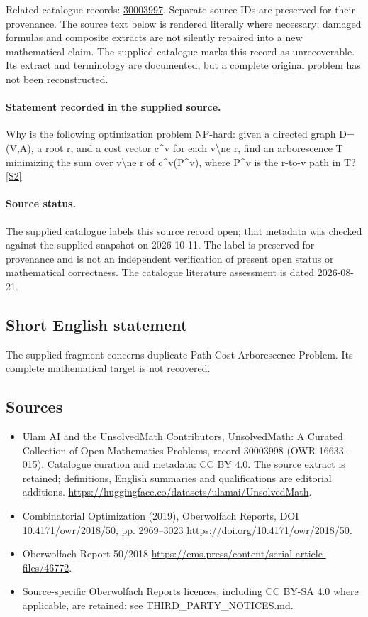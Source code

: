 \documentclass[11pt]{article}
\begin{document}
Related catalogue records: \href{https://mehmetmars7.github.io/Erdosproblems-llm-hunter/problem.html?type=open_problems&id=30003997}{30003997}. Separate source IDs are preserved for their provenance.
The source text below is rendered literally where necessary; damaged formulas and composite extracts are not silently repaired into a new mathematical claim.
The supplied catalogue marks this record as unrecoverable. Its extract and terminology are documented, but a complete original problem has not been reconstructed.
\paragraph{Statement recorded in the supplied source.}
Why is the following optimization problem NP-hard: given a directed graph D=(V,A), a root r, and a cost vector c\textasciicircum{}v for each v\textbackslash{}ne r, find an arborescence T minimizing the sum over v\textbackslash{}ne r of c\textasciicircum{}v(P\textasciicircum{}v), where P\textasciicircum{}v is the r-to-v path in T? \href{https://doi.org/10.4171/owr/2018/50}{[S2]}
\paragraph{Source status.}
The supplied catalogue labels this source record open; that metadata was checked against the supplied snapshot on 2026-10-11. The label is preserved for provenance and is not an independent verification of present open status or mathematical correctness. The catalogue literature assessment is dated 2026-08-21.
\subsection{Short English statement}
The supplied fragment concerns duplicate Path-Cost Arborescence Problem. Its complete mathematical target is not recovered.
\subsection{Sources}
\begin{itemize}
\item[S1] Ulam AI and the UnsolvedMath Contributors, UnsolvedMath: A Curated Collection of Open Mathematics Problems, record 30003998 (OWR-16633-015). Catalogue curation and metadata: CC BY 4.0. The source extract is retained; definitions, English summaries and qualifications are editorial additions.
\url{https://huggingface.co/datasets/ulamai/UnsolvedMath}.
\item[S2] Combinatorial Optimization (2019), Oberwolfach Reports, DOI 10.4171/owr/2018/50, pp. 2969--3023
\url{https://doi.org/10.4171/owr/2018/50}.
\item[S3] Oberwolfach Report 50/2018
\url{https://ems.press/content/serial-article-files/46772}.
\item Source-specific Oberwolfach Reports licences, including CC BY-SA 4.0 where applicable, are retained; see THIRD\_PARTY\_NOTICES.md.
\end{itemize}
\end{document}
